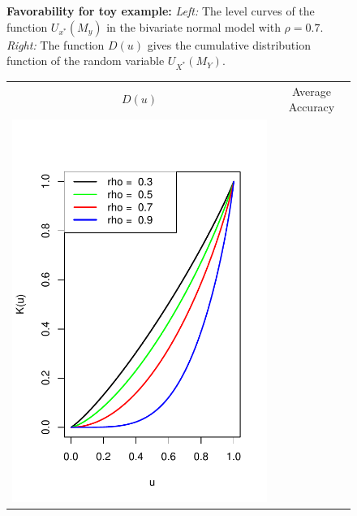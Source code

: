 \documentclass[twoside,11pt]{article}
\newenvironment{myfont}{\fontfamily{phv}\selectfont}{\par}
\begin{document}
\begin{figure}[p]
\caption{\textbf{Favorability for toy example:}
\emph{Left:} The level curves of the function $U_{x^*}(M_y)$ in the bivariate normal model with $\rho = 0.7$.
\emph{Right:} The function ${D}(u)$ gives the cumulative distribution function of the random variable $U_{X^*}(M_Y)$.}\label{fig:toy3}
\end{figure}

\begin{figure}[p]
\centering
\begin{tabular}{cc}
\begin{myfont}\hspace{0.2in}$D(u)$\end{myfont} &
\begin{myfont}\hspace{0.4in}Average Accuracy\end{myfont} \\
\includegraphics[scale = 0.6, clip = true, trim = 0.22in 0 0.2in 0.6in]{illus_rhos_Kfunc.pdf} &

\end{tabular}
\end{figure}
\end{document}

